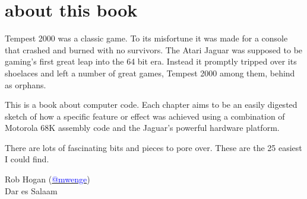 \chapter*{about this book} 
Tempest 2000 was a classic game. To its misfortune it was made for a console that crashed and burned with no
survivors. The Atari Jaguar was supposed to be gaming's first great leap into the 64 bit era. Instead it 
promptly tripped over its shoelaces and left a number of great games, Tempest 2000 among them, behind
as orphans.

This is a book about computer code. Each chapter aims to be an easily digested sketch of how
a specific feature or effect was achieved using a combination of Motorola 68K assembly code and
the Jaguar's powerful hardware platform.

There are lots of fascinating bits and pieces to pore over. These are the 25 easiest I could find.


Rob Hogan (\href{https://mastodon.social/@mwenge}{\textcolor{blue}{@mwenge}})\\
Dar es Salaam \the\year{} \\

